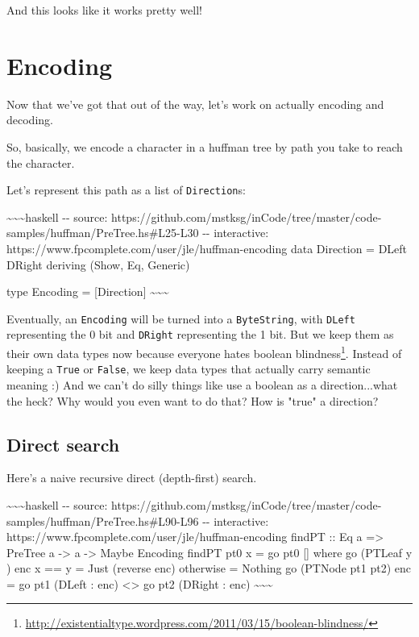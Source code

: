 \documentclass[]{article}
\renewcommand{\href}[2]{#2\footnote{\url{#1}}}
\begin{document}
And this looks like it works pretty well!

\section{Encoding}

Now that we've got that out of the way, let's work on actually encoding and
decoding.

So, basically, we encode a character in a huffman tree by path you take to reach
the character.

Let's represent this path as a list of \texttt{Direction}s:

\textasciitilde{}\textasciitilde{}\textasciitilde{}haskell -\/- source:
https://github.com/mstksg/inCode/tree/master/code-samples/huffman/PreTree.hs\#L25-L30
-\/- interactive: https://www.fpcomplete.com/user/jle/huffman-encoding data
Direction = DLeft \textbar{} DRight deriving (Show, Eq, Generic)

type Encoding = {[}Direction{]}
\textasciitilde{}\textasciitilde{}\textasciitilde{}

Eventually, an \texttt{Encoding} will be turned into a \texttt{ByteString}, with
\texttt{DLeft} representing the 0 bit and \texttt{DRight} representing the 1
bit. But we keep them as their own data types now because everyone hates
\href{http://existentialtype.wordpress.com/2011/03/15/boolean-blindness/}{boolean
blindness}. Instead of keeping a \texttt{True} or \texttt{False}, we keep data
types that actually carry semantic meaning :) And we can't do silly things like
use a boolean as a direction...what the heck? Why would you even want to do
that? How is "true" a direction?

\subsection{Direct search}

Here's a naive recursive direct (depth-first) search.

\textasciitilde{}\textasciitilde{}\textasciitilde{}haskell -\/- source:
https://github.com/mstksg/inCode/tree/master/code-samples/huffman/PreTree.hs\#L90-L96
-\/- interactive: https://www.fpcomplete.com/user/jle/huffman-encoding findPT ::
Eq a =\textgreater{} PreTree a -\textgreater{} a -\textgreater{} Maybe Encoding
findPT pt0 x = go pt0 {[}{]} where go (PTLeaf y ) enc \textbar{} x == y = Just
(reverse enc) \textbar{} otherwise = Nothing go (PTNode pt1 pt2) enc = go pt1
(DLeft : enc) \textless{}\textbar{}\textgreater{} go pt2 (DRight : enc)
\textasciitilde{}\textasciitilde{}\textasciitilde{}
\end{document}
